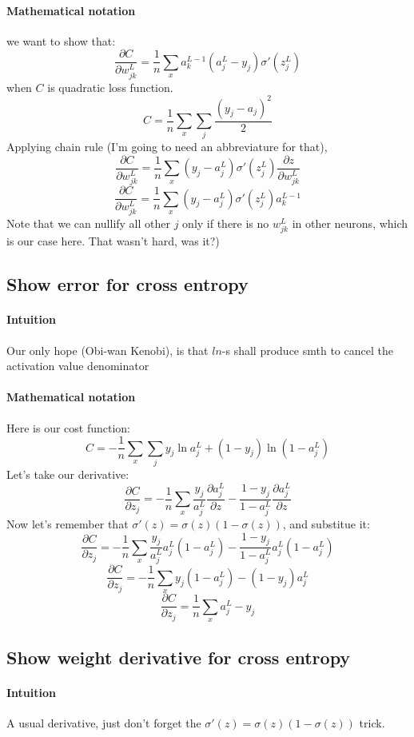 \documentclass{article}
\begin{document}
\paragraph{Mathematical notation}
we want to show that:
$$\frac{\partial C}{\partial w^L_{jk}} = \frac{1}{n} \sum_x a^{L-1}_k  (a^L_j-y_j) \sigma'(z^L_j)$$
when $C$ is quadratic loss function.
$$C = \frac{1}{n} \sum_x \sum_j \frac{(y_j-a_j)^2}{2}$$
Applying chain rule (I'm going to need an abbreviature for that),
$$ \frac{\partial C}{\partial w^L_{jk}} = \frac{1}{n} \sum_x (y_j - a^L_j) \sigma'(z^L_j) \frac{\partial z}{\partial w^L_{jk}}$$
$$ \frac{\partial C}{\partial w^L_{jk}} = \frac{1}{n} \sum_x (y_j - a^L_j) \sigma'(z^L_j) a^{L-1}_{k}$$
Note that we can nullify all other $j$ only if there is no $w^L_{jk}$ in other neurons, which is our case here.
That wasn't hard, was it?)


\subsection{Show error for cross entropy}
\paragraph{Intuition}
Our only hope (Obi-wan Kenobi), is that $ln$-s shall produce smth to cancel the activation value denominator
\paragraph{Mathematical notation}
Here is our cost function:
$$C = -\frac{1}{n} \sum_x \sum_j y_j \ln a^L_j + (1-y_j) \ln (1-a^L_j)$$
Let's take our derivative:
$$\frac{\partial C}{\partial z_j} = -\frac{1}{n} \sum_x \frac{y_j}{a^L_j} \frac{\partial a^L_j}{\partial z}- \frac{1-y_j}{1-a^L_j} \frac{\partial a^L_j}{\partial z}$$
Now let's remember that $\sigma'(z) = \sigma(z)(1 - \sigma(z))$, and substitue it:
$$\frac{\partial C}{\partial z_j} = -\frac{1}{n} \sum_x \frac{y_j}{a^L_j} a^L_j(1 - a^L_j) - \frac{1-y_j}{1-a^L_j} a^L_j(1 - a^L_j)$$
$$\frac{\partial C}{\partial z_j} = -\frac{1}{n} \sum_x y_j(1 - a^L_j) - (1-y_j)a^L_j$$
$$\frac{\partial C}{\partial z_j} = \frac{1}{n} \sum_x a^L_j - y_j$$

\subsection{Show weight derivative for cross entropy}
\paragraph{Intuition}
A usual derivative, just don't forget the $\sigma'(z) = \sigma(z)(1 - \sigma(z))$ trick.
\end{document}
